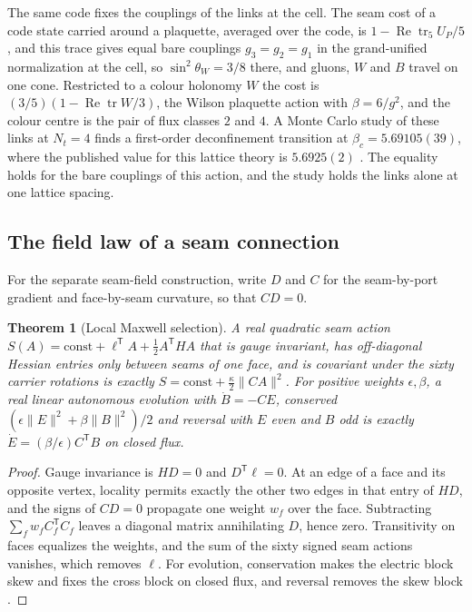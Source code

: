 \documentclass[11pt]{article}
\newtheorem{theorem}{Theorem}[section]
\theoremstyle{definition}
\theoremstyle{remark}
\begin{document}
The same code fixes the couplings of the links at the cell. The seam cost of
a code state carried around a plaquette, averaged over the code, is
$1-\operatorname{Re}\operatorname{tr}_5U_P/5$, and this trace gives equal bare
couplings $g_3=g_2=g_1$ in the grand-unified normalization at the cell, so
$\sin^2\theta_W=3/8$ there, and gluons, $W$ and $B$ travel on one cone.
Restricted to a colour holonomy $W$ the cost is
$(3/5)(1-\operatorname{Re}\operatorname{tr}W/3)$, the Wilson plaquette action
with $\beta=6/g^2$, and the colour centre is the pair of flux classes $2$ and
$4$. A Monte Carlo study of these links at $N_t=4$ finds a first-order
deconfinement transition at $\beta_c=5.69105(39)$, where the published value
for this lattice theory is $5.6925(2)$ \cite{ophGauge,boyd1996thermodynamics}.
The equality holds for the bare couplings of this action, and the study holds
the links alone at one lattice spacing.

\subsection{The field law of a seam connection}
\label{sec:fields}

For the separate seam-field construction, write $D$ and $C$ for the seam-by-port
gradient and face-by-seam curvature, so that $CD=0$.

\begin{theorem}[Local Maxwell selection]
\label{thm:maxwell-selection}
A real quadratic seam action $S(A)=\mathrm{const}+\ell^{\mathsf T}A+\tfrac12A^{\mathsf T}HA$
that is gauge invariant, has off-diagonal Hessian entries only between seams of one face,
and is covariant under the sixty carrier rotations is exactly
$S=\mathrm{const}+\tfrac\kappa2\|CA\|^2$. For positive weights $\epsilon,\beta$, a real linear
autonomous evolution with $\dot B=-CE$, conserved $(\epsilon\|E\|^2+\beta\|B\|^2)/2$ and
reversal with $E$ even and $B$ odd is exactly $\dot E=(\beta/\epsilon)C^{\mathsf T}B$ on closed
flux.
\end{theorem}

\begin{proof}
Gauge invariance is $HD=0$ and $D^{\mathsf T}\ell=0$. At an edge of a face and its opposite
vertex, locality permits exactly the other two edges in that entry of $HD$, and the signs of
$CD=0$ propagate one weight $w_f$ over the face. Subtracting $\sum_fw_fC_f^{\mathsf T}C_f$ leaves
a diagonal matrix annihilating $D$, hence zero. Transitivity on faces equalizes the weights,
and the sum of the sixty signed seam actions vanishes, which removes $\ell$. For evolution,
conservation makes the electric block skew and fixes the cross block on closed flux, and
reversal removes the skew block \cite{ophMicrophysics}.
\end{proof}
\end{document}

